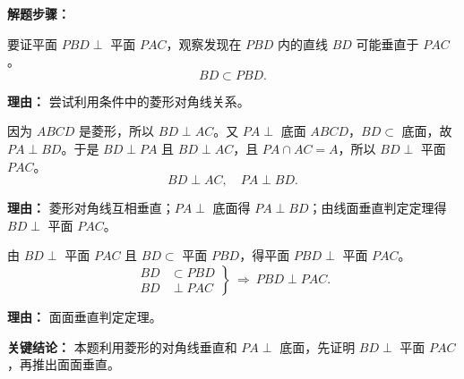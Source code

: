 \begin{examplebox}
	\medskip
	\textbf{\textcolor{CExample}{解题步骤：}}
	\begin{description}[style=nextline, leftmargin=2.8em, labelsep=0.5em, itemsep=0.45em]
		\item[\textbf{第一步（目标分析）：}]
			要证平面 $PBD\perp$ 平面 $PAC$，观察发现在 $PBD$ 内的直线 $BD$ 可能垂直于 $PAC$。
			\[
				BD\subset PBD.
			\]
			\par\textbf{理由：} 尝试利用条件中的菱形对角线关系。
		\item[\textbf{第二步（证明线面垂直）：}]
			因为 $ABCD$ 是菱形，所以 $BD\perp AC$。又 $PA\perp$ 底面 $ABCD$，$BD\subset$ 底面，故 $PA\perp BD$。于是 $BD\perp PA$ 且 $BD\perp AC$，且 $PA\cap AC=A$，所以 $BD\perp$ 平面 $PAC$。
			\[
				BD\perp AC,\quad PA\perp BD.
			\]
			\par\textbf{理由：} 菱形对角线互相垂直；$PA\perp$ 底面得 $PA\perp BD$；由线面垂直判定定理得 $BD\perp$ 平面 $PAC$。
		\item[\textbf{第三步（套用定理）：}]
			由 $BD\perp$ 平面 $PAC$ 且 $BD\subset$ 平面 $PBD$，得平面 $PBD\perp$ 平面 $PAC$。
			\[
				\left.
				\begin{aligned}
					BD &\subset PBD\\BD &\perp PAC
			\end{aligned}
				\right\}\ \Rightarrow\ PBD\perp PAC.
			\]
			\par\textbf{理由：} 面面垂直判定定理。
	\end{description}

	\medskip
	\textbf{\textcolor{CExample}{关键结论：}}
	本题利用菱形的对角线垂直和 $PA\perp$ 底面，先证明 $BD\perp$ 平面 $PAC$，再推出面面垂直。
\end{examplebox}
